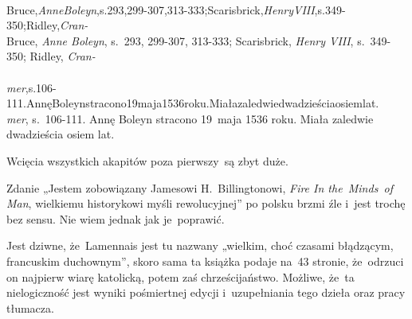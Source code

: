 \documentclass[a4paper,11pt]{article}
\begin{document}
\noindent
{} \\
\Jest Bruce,\textit{AnneBoleyn},s.293,299-307,313-333;Scarisbrick,\emph{HenryVIII},s.349-350;Ridley,\emph{Cran-} \\
\Powin Bruce, \textit{Anne Boleyn}, s.~293, 299-307, 313-333; Scarisbrick,
\textit{Henry VIII}, s.~349-350; Ridley, \emph{Cran-} \\
 \\
\Jest
\textit{mer},s.106-111.AnnęBoleynstracono19maja1536roku.Miałazaledwiedwadzieściaosiemlat. \\
\Powin \textit{mer}, s.~106-111. Annę Boleyn stracono 19~maja 1536 roku.
Miała zaledwie dwadzieścia osiem lat. \\

\vspace{\spaceTwo}














\start {} Wcięcia wszystkich akapitów poza pierwszy~są zbyt
duże.

\vspace{\spaceFour}



\start {} Zdanie „Jestem zobowiązany Jamesowi
H.~Billingtonowi, \textit{Fire In the~Minds~of Man}, wielkiemu
historykowi myśli rewolucyjnej” po polsku brzmi źle i~jest trochę bez
sensu. Nie wiem jednak jak je~poprawić.

\vspace{\spaceFour}



\start {} Jest dziwne, że~Lamennais jest tu nazwany „wielkim,
choć czasami błądzącym, francuskim duchownym”, skoro sama ta książka
podaje na~43 stronie, że~odrzuci on najpierw wiarę katolicką, potem
zaś chrześcijaństwo. Możliwe, że~ta nielogiczność jest wyniki
pośmiertnej edycji i~uzupełniania tego dzieła oraz pracy tłumacza.

\vspace{\spaceFour}
\end{document}
